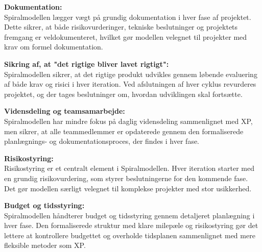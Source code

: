 \textbf{Dokumentation:}\\
Spiralmodellen lægger vægt på grundig dokumentation i hver fase af projektet. 
Dette sikrer, at både risikovurderinger, tekniske beslutninger og projektets fremgang er veldokumenteret, hvilket gør modellen velegnet til projekter med krav om formel dokumentation.

\textbf{Sikring af, at "det rigtige bliver lavet rigtigt":}\\
Spiralmodellen sikrer, at det rigtige produkt udvikles gennem løbende evaluering af både krav og risici i hver iteration. 
Ved afslutningen af hver cyklus revurderes projektet, og der tages beslutninger om, hvordan udviklingen skal fortsætte.

\textbf{Vidensdeling og teamsamarbejde:}\\
Spiralmodellen har mindre fokus på daglig vidensdeling sammenlignet med XP, men sikrer, 
at alle teammedlemmer er opdaterede gennem den formaliserede planlægnings- og dokumentationsproces, der findes i hver fase.

\textbf{Risikostyring:}\\
Risikostyring er et centralt element i Spiralmodellen. Hver iteration starter med en grundig risikovurdering, 
som styrer beslutningerne for den kommende fase. Det gør modellen særligt velegnet til komplekse projekter med stor usikkerhed.

\textbf{Budget og tidsstyring:}\\
Spiralmodellen håndterer budget og tidsstyring gennem detaljeret planlægning i hver fase. 
Den formaliserede struktur med klare milepæle og risikostyring gør det lettere at kontrollere budgettet og overholde tidsplanen sammenlignet med mere fleksible metoder som XP.